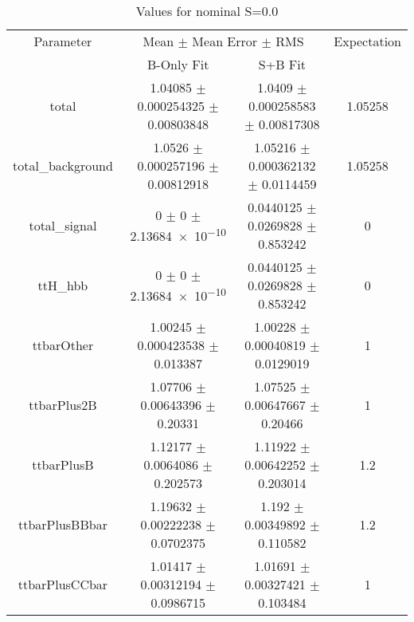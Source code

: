 \begin{table}
\centering
\caption{Values for nominal S=0.0}
\begin{tabular}{cccc}
\toprule
Parameter & \multicolumn{2}{c}{Mean $\pm$ Mean Error $\pm$ RMS} & Expectation\\
 & B-Only Fit & S+B Fit & \\
\midrule
total & \num{1.04085} $\pm$ \num{0.000254325} $\pm$ \num{0.00803848} & \num{1.0409} $\pm$ \num{0.000258583} $\pm$ \num{0.00817308} & \num{1.05258}\\
total\_background & \num{1.0526} $\pm$ \num{0.000257196} $\pm$ \num{0.00812918} & \num{1.05216} $\pm$ \num{0.000362132} $\pm$ \num{0.0114459} & \num{1.05258}\\
total\_signal & \num{0} $\pm$ \num{0} $\pm$ \num{2.13684e-10} & \num{0.0440125} $\pm$ \num{0.0269828} $\pm$ \num{0.853242} & \num{0}\\
ttH\_hbb & \num{0} $\pm$ \num{0} $\pm$ \num{2.13684e-10} & \num{0.0440125} $\pm$ \num{0.0269828} $\pm$ \num{0.853242} & \num{0}\\
ttbarOther & \num{1.00245} $\pm$ \num{0.000423538} $\pm$ \num{0.013387} & \num{1.00228} $\pm$ \num{0.00040819} $\pm$ \num{0.0129019} & \num{1}\\
ttbarPlus2B & \num{1.07706} $\pm$ \num{0.00643396} $\pm$ \num{0.20331} & \num{1.07525} $\pm$ \num{0.00647667} $\pm$ \num{0.20466} & \num{1}\\
ttbarPlusB & \num{1.12177} $\pm$ \num{0.0064086} $\pm$ \num{0.202573} & \num{1.11922} $\pm$ \num{0.00642252} $\pm$ \num{0.203014} & \num{1.2}\\
ttbarPlusBBbar & \num{1.19632} $\pm$ \num{0.00222238} $\pm$ \num{0.0702375} & \num{1.192} $\pm$ \num{0.00349892} $\pm$ \num{0.110582} & \num{1.2}\\
ttbarPlusCCbar & \num{1.01417} $\pm$ \num{0.00312194} $\pm$ \num{0.0986715} & \num{1.01691} $\pm$ \num{0.00327421} $\pm$ \num{0.103484} & \num{1}\\
\bottomrule
\end{tabular}
\end{table}